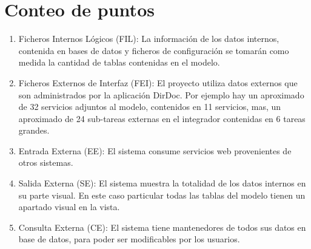 \documentclass[a4paper,12pt,openany,oneside]{book}
\begin{document}
\section{Conteo de puntos}

\begin{enumerate}
	\item Ficheros Internos Lógicos (FIL): La información de los datos internos, contenida en bases de datos y ficheros de configuración se tomarán como medida la cantidad de tablas contenidas en el modelo.
	\item Ficheros Externos de Interfaz (FEI): El proyecto utiliza datos externos que son administrados por la aplicación DirDoc. Por ejemplo hay un aproximado de 32 servicios adjuntos al modelo, contenidos en 11 servicios, mas, un aproximado de 24 sub-tareas externas en el integrador contenidas en 6 tareas grandes.
	\item Entrada Externa (EE): El sistema consume servicios web provenientes de otros sistemas.
	\item Salida Externa (SE): El sistema muestra la totalidad de los datos internos en su parte visual. En este caso particular todas las tablas del modelo tienen un apartado visual en la vista.
	\item Consulta Externa (CE): El sistema tiene mantenedores de todos sus datos en base de datos, para poder ser modificables por los usuarios.
\end{enumerate}
\end{document}
